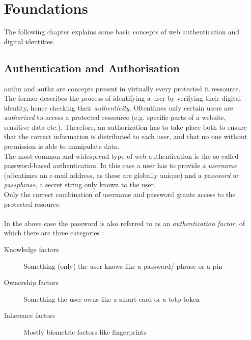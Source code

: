 
\section{Foundations}
\label{sec:foundations}

The following chapter explains some basic concepts of web authentication and digital identities.

\subsection{Authentication and Authorisation}
\label{subsec:authn_authz}

\ac{authn} and \ac{authz} are concepts present in virtually every protected \ac{it} ressource.
The former describes the process of identifying a user by verifying their digital identity, hence checking their \emph{authenticity}. Oftentimes only certain users are \emph{authorized} to access a protected ressource (e.g. specific parts of a website, sensitive data etc.). Therefore, an authorization has to take place both to ensure that the correct information is distributed to each user, and that no one without permission is able to manipulate data.\\
The most common and widespread type of web authentication is the so-called password-based authentication. In this case a user has to provide a \emph{username} (oftentimes an e-mail address, as these are globally unique) and a \emph{password} or \emph{passphrase}, a secret string only known to the user.\\
Only the correct combination of username and password grants access to the protected resource.\\
\\
In the above case the password is also referred to as an \emph{authentication factor}, of which there are three categories \cite{turner2016}:

\begin{description}
    \item[Knowledge factors] Something (only) the user knows like a password/-phrase or a \ac{pin}
    \item[Ownership factors] Something the user owns like a smart card or a \ac{totp} token
    \item[Inherence factors] Mostly biometric factors like fingerprints
\end{description}

